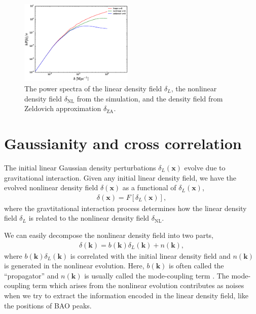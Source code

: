 \documentclass[aps,prd,twocolumn,showpacs,superscriptaddress,groupedaddress,nofootinbib]{revtex4}  %
\newcommand{\mr}{\mathrm}
\begin{document}
\begin{figure}[tbp]
\begin{center}
\includegraphics[width=0.48\textwidth]{f1.eps}
\end{center}
\vspace{-0.7cm}
\caption{The power spectra of the linear density field $\delta_L$, 
the nonlinear density field $\delta_\mr{NL}$ from the simulation, 
and the density field from Zeldovich approximation $\delta_\mr{ZA}$.}
\label{fig:ps}
\end{figure}

\section{Gaussianity and cross correlation}
The initial linear Gaussian density perturbations $\delta_L(\bm{x})$ 
evolve due to gravitational interaction. 
Given any initial linear density field, we have the evolved nonlinear density 
field $\delta(\bm{x})$ as a functional of $\delta_L(\bm{x})$,
\begin{eqnarray}
\delta(\bm{x})=F[\delta_L(\bm{x})],
\end{eqnarray}
where the gravtitational interaction process determines how the linear density
field $\delta_L$ is related to the nonlinear density field $\delta_\mr{NL}$.

We can easily decompose the nonlinear density field into two parts, 
\begin{eqnarray}
\delta(\bm{k})=b(\bm{k})\delta_L(\bm{k})+n(\bm{k}),
\end{eqnarray}
where $b(\bm{k})\delta_L(\bm{k})$ is correlated with the initial linear 
density field and $n(\bm{k})$ is generated in the nonlinear evolution.
Here, $b(\bm{k})$ is often called the ``propagator'' and $n(\bm{k})$ is usually
called the mode-coupling term \cite{2006crocce,2008crocce,2008matsubara}.
The mode-coupling term which arises from the nonlinear evolution contributes
as noises when we try to extract the information encoded in the linear density
field, like the positions of BAO peaks.
\end{document}
